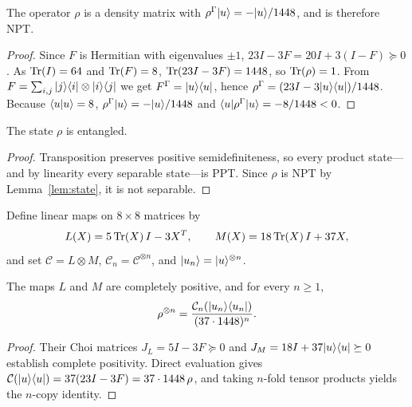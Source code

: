 \begin{lemma}
\label{lem:state}
\leanok
The operator $\rho$ is a density matrix with $\rho^{\Gamma}|u\rangle=-|u\rangle/1448$, and is therefore NPT.
\end{lemma}
\begin{proof}
\leanok
Since $F$ is Hermitian with eigenvalues $\pm 1$, $23I-3F = 20I+3(I-F)\succeq 0$. As $\operatorname{Tr}(I)=64$ and $\operatorname{Tr}(F)=8$, $\operatorname{Tr}(23I-3F)=1448$, so $\operatorname{Tr}(\rho)=1$. From $F=\sum_{i,j}|j\rangle\langle i|\otimes|i\rangle\langle j|$ we get $F^{\Gamma}=|u\rangle\langle u|$, hence $\rho^{\Gamma}=(23I-3|u\rangle\langle u|)/1448$. Because $\langle u|u\rangle=8$, $\rho^{\Gamma}|u\rangle=-|u\rangle/1448$ and $\langle u|\rho^{\Gamma}|u\rangle=-8/1448<0$.
\end{proof}

\begin{lemma}
\label{lem:nonseparable}
\leanok
{}
The state $\rho$ is entangled.
\end{lemma}
\begin{proof}
\leanok
Transposition preserves positive semidefiniteness, so every product state---and by linearity every separable state---is PPT. Since $\rho$ is NPT by Lemma~\ref{lem:state}, it is not separable.
\end{proof}

Define linear maps on $8\times 8$ matrices by
\[
  L(X) = 5\operatorname{Tr}(X)\,I - 3X^T, \qquad M(X) = 18\operatorname{Tr}(X)\,I + 37X,
\]
and set $\mathcal{C} = L\otimes M$, $\mathcal{C}_n = \mathcal{C}^{\otimes n}$, and $|u_n\rangle = |u\rangle^{\otimes n}$.

\begin{lemma}
\label{lem:maps}
\leanok
The maps $L$ and $M$ are completely positive, and for every $n\ge 1$,
\[
  \rho^{\otimes n} = \frac{\mathcal{C}_n(|u_n\rangle\langle u_n|)}{(37\cdot 1448)^n}.
\]
\end{lemma}
\begin{proof}
\leanok
Their Choi matrices $J_L = 5I - 3F \succeq 0$ and $J_M = 18I + 37|u\rangle\langle u| \succeq 0$ establish complete positivity. Direct evaluation gives $\mathcal{C}(|u\rangle\langle u|) = 37(23I - 3F) = 37\cdot 1448\,\rho$, and taking $n$-fold tensor products yields the $n$-copy identity.
\end{proof}

